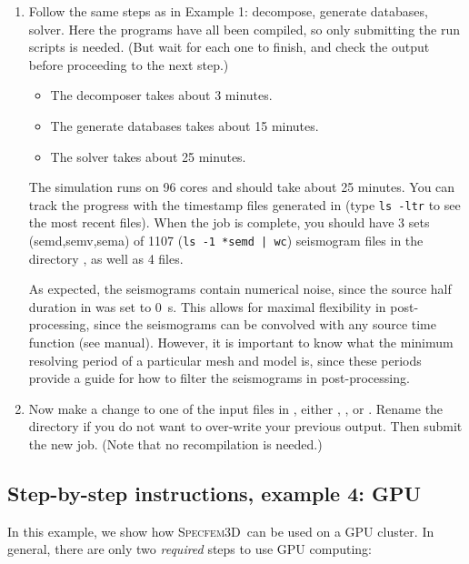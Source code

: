 \documentclass[10pt,fleqn,letterpaper]{article}
\newcommand{\specfem}{\textsc{Specfem3D}}
\begin{document}
\begin{enumerate}
\item Follow the same steps as in Example 1: decompose, generate databases, solver. Here the programs have all been compiled, so only submitting the run scripts is needed. (But wait for each one to finish, and check the output before proceeding to the next step.)
%
\begin{itemize}
\item The decomposer takes about 3 minutes.
\item The generate databases takes about 15 minutes.
\item The solver takes about 25 minutes.
\end{itemize}
%
The simulation runs on 96 cores and should take about 25 minutes. You can track the progress with the timestamp files generated in  (type \texttt{ls -ltr} to see the most recent files). When the job is complete, you should have 3 sets (semd,semv,sema) of 1107 (\texttt{ls -1 *semd | wc}) seismogram files in the directory , as well as 4  files.

As expected, the seismograms contain numerical noise, since the source half duration in  was set to 0~s. This allows for maximal flexibility in post-processing, since the seismograms can be convolved with any source time function (see manual). However, it is important to know what the minimum resolving period of a particular mesh and model is, since these periods provide a guide for how to filter the seismograms in post-processing.

\item Now make a change to one of the input files in , either , , or . Rename the  directory if you do not want to over-write your previous output. Then submit the new job. (Note that no recompilation is needed.)

\end{enumerate}


\subsection*{Step-by-step instructions, example 4: GPU}

In this example, we show how \specfem\ can be used on a GPU cluster. In general,
there are only two {\em required} steps to use GPU computing:
\end{document}

